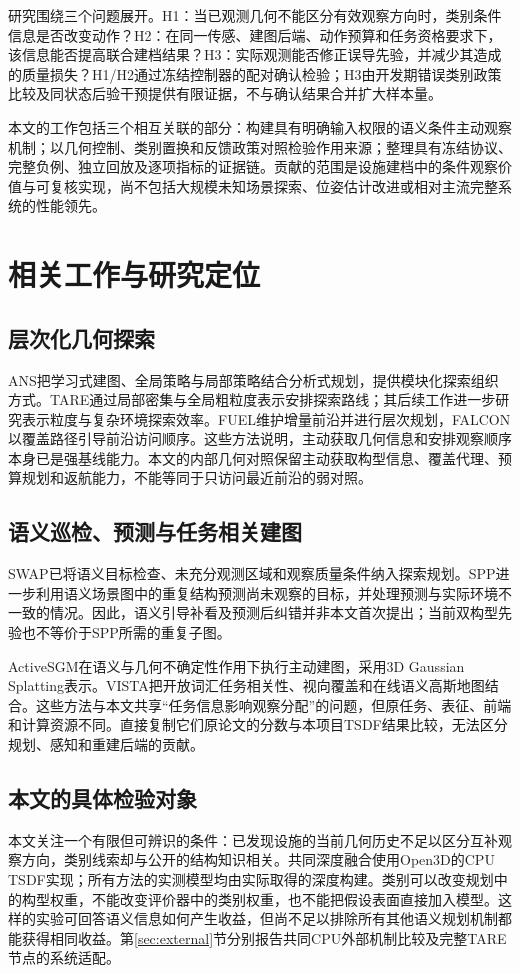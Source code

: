 \documentclass[11pt,a4paper]{article}
\begin{document}
研究围绕三个问题展开。H1：当已观测几何不能区分有效观察方向时，类别条件信息是否改变动作？H2：在同一传感、建图后端、动作预算和任务资格要求下，该信息能否提高联合建档结果？H3：实际观测能否修正误导先验，并减少其造成的质量损失？H1/H2通过冻结控制器的配对确认检验；H3由开发期错误类别政策比较及同状态后验干预提供有限证据，不与确认结果合并扩大样本量。

本文的工作包括三个相互关联的部分：构建具有明确输入权限的语义条件主动观察机制；以几何控制、类别置换和反馈政策对照检验作用来源；整理具有冻结协议、完整负例、独立回放及逐项指标的证据链。贡献的范围是设施建档中的条件观察价值与可复核实现，尚不包括大规模未知场景探索、位姿估计改进或相对主流完整系统的性能领先。

\section{相关工作与研究定位}
\subsection{层次化几何探索}
ANS把学习式建图、全局策略与局部策略结合分析式规划，提供模块化探索组织方式\cite{chaplot2020}。TARE通过局部密集与全局粗粒度表示安排探索路线；其后续工作进一步研究表示粒度与复杂环境探索效率\cite{cao2021tare,cao2023granularity}。FUEL维护增量前沿并进行层次规划，FALCON以覆盖路径引导前沿访问顺序\cite{zhou2021fuel,zhang2025falcon}。这些方法说明，主动获取几何信息和安排观察顺序本身已是强基线能力。本文的内部几何对照保留主动获取构型信息、覆盖代理、预算规划和返航能力，不能等同于只访问最近前沿的弱对照。

\subsection{语义巡检、预测与任务相关建图}
SWAP已将语义目标检查、未充分观测区域和观察质量条件纳入探索规划\cite{dharmadhikari2023swap}。SPP进一步利用语义场景图中的重复结构预测尚未观察的目标，并处理预测与实际环境不一致的情况\cite{dharmadhikari2025spp}。因此，语义引导补看及预测后纠错并非本文首次提出；当前双构型先验也不等价于SPP所需的重复子图。

ActiveSGM在语义与几何不确定性作用下执行主动建图，采用3D Gaussian Splatting表示\cite{chen2025activesgm}。VISTA把开放词汇任务相关性、视向覆盖和在线语义高斯地图结合\cite{nagami2026vista}。这些方法与本文共享“任务信息影响观察分配”的问题，但原任务、表征、前端和计算资源不同。直接复制它们原论文的分数与本项目TSDF结果比较，无法区分规划、感知和重建后端的贡献。

\subsection{本文的具体检验对象}
本文关注一个有限但可辨识的条件：已发现设施的当前几何历史不足以区分互补观察方向，类别线索却与公开的结构知识相关。共同深度融合使用Open3D的CPU TSDF实现\cite{zhou2018open3d}；所有方法的实测模型均由实际取得的深度构建。类别可以改变规划中的构型权重，不能改变评价器中的类别权重，也不能把假设表面直接加入模型。这样的实验可回答语义信息如何产生收益，但尚不足以排除所有其他语义规划机制都能获得相同收益。第\ref{sec:external}节分别报告共同CPU外部机制比较及完整TARE节点的系统适配。
\end{document}
